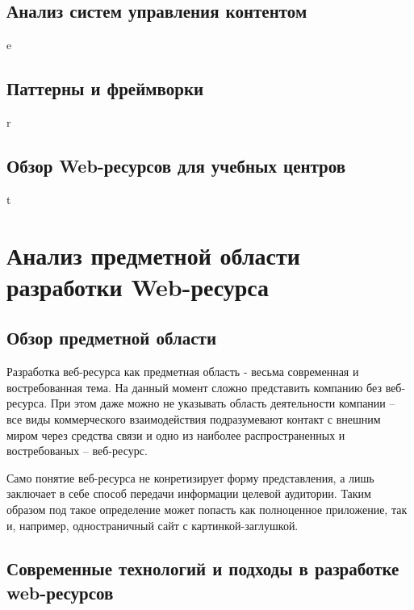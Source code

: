 \subsection{Анализ систем управления контентом}
e
\subsection{Паттерны и фреймворки}
r
\subsection{Обзор Web-ресурсов для учебных центров}
t

\section{Анализ предметной области разработки Web-ресурса}
\subsection{Обзор предметной области}
    Разработка веб-ресурса как предметная область - весьма современная и востребованная тема.
    На данный момент сложно представить компанию без веб-ресурса.
    При этом даже можно не указывать область деятельности компании -- все виды коммерческого взаимодействия подразумевают контакт с внешним миром через средства связи и одно из наиболее распространенных и востребованых -- веб-ресурс.
    
    Само понятие веб-ресурса не конретизирует форму представления, а лишь заключает в себе способ передачи информации целевой аудитории.
    Таким образом под такое определение может попасть как полноценное приложение, так и, например, одностраничный сайт с картинкой-заглушкой.


\subsection{Современные технологий и подходы в разработке web-ресурсов}

